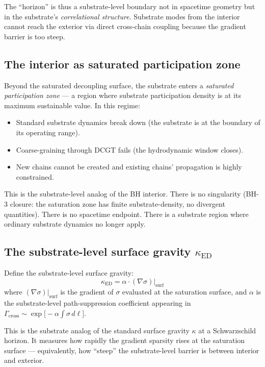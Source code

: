 \documentclass[11pt,a4paper]{article}
\begin{document}
The ``horizon'' is thus a substrate-level boundary not in spacetime geometry but in the substrate's \emph{correlational structure}. Substrate modes from the interior cannot reach the exterior via direct cross-chain coupling because the gradient barrier is too steep.

\subsection{The interior as saturated participation zone}

Beyond the saturated decoupling surface, the substrate enters a \emph{saturated participation zone} --- a region where substrate participation density is at its maximum sustainable value. In this regime:

\begin{itemize}[noitemsep]
  \item Standard substrate dynamics break down (the substrate is at the boundary of its operating range).
  \item Coarse-graining through DCGT fails (the hydrodynamic window closes).
  \item New chains cannot be created and existing chains' propagation is highly constrained.
\end{itemize}

This is the substrate-level analog of the BH interior. There is no singularity (BH-3 closure: the saturation zone has finite substrate-density, no divergent quantities). There is no spacetime endpoint. There is a substrate region where ordinary substrate dynamics no longer apply.

\subsection{The substrate-level surface gravity $\kappa_{\mathrm{ED}}$}

Define the substrate-level surface gravity:
\[
\kappa_{\mathrm{ED}} = \alpha \cdot (\nabla\sigma)|_{\mathrm{surf}}
\]
where $(\nabla\sigma)|_{\mathrm{surf}}$ is the gradient of $\sigma$ evaluated at the saturation surface, and $\alpha$ is the substrate-level path-suppression coefficient appearing in $\Gamma_{\mathrm{cross}} \sim \exp\bigl[-\alpha\int\sigma\,d\ell\bigr]$.

This is the substrate analog of the standard surface gravity $\kappa$ at a Schwarzschild horizon. It measures how rapidly the gradient sparsity rises at the saturation surface --- equivalently, how ``steep'' the substrate-level barrier is between interior and exterior.
\end{document}
